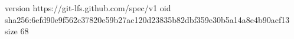 version https://git-lfs.github.com/spec/v1
oid sha256:6efd90e9f562c37820e59b27ac120d23835b82dbf359e30b5a14a8e4b90acf13
size 68
